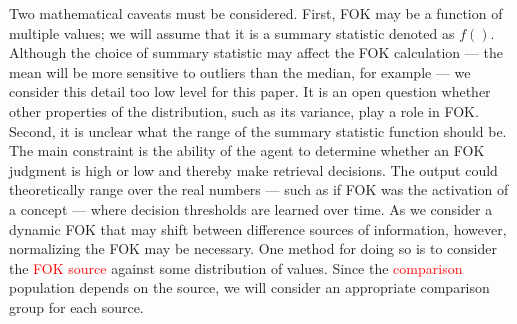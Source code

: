 \documentclass[10pt,letterpaper]{article}
\newcommand{\fixme}[2][]{#2}
\renewcommand{\fixme}[2][]{\textcolor{red}{#2}}
\begin{document}
Two mathematical caveats must be considered.
First, FOK may be a function of multiple values; we will assume that it is a summary statistic denoted as $f()$.
Although the choice of summary statistic may affect the FOK calculation --- the mean will be more sensitive to outliers than the median, for example --- we consider this detail too low level for this paper.
It is an open question whether other properties of the distribution, such as its variance, play a role in FOK. %
Second, it is unclear what the range of the summary statistic function should be.
The main constraint is the ability of the agent to determine whether an FOK judgment is high or low and thereby make retrieval decisions.
The output could theoretically range over the real numbers --- such as if FOK was the activation of a concept --- where decision thresholds are learned over time. %
As we consider a dynamic FOK that may shift between difference sources of information, however, normalizing the FOK may be necessary.
One method for doing so is to consider the \fixme{FOK source} against some distribution of values.
Since the \fixme{comparison} population depends on the source, we will consider an appropriate comparison group for each source. %

\end{document}

